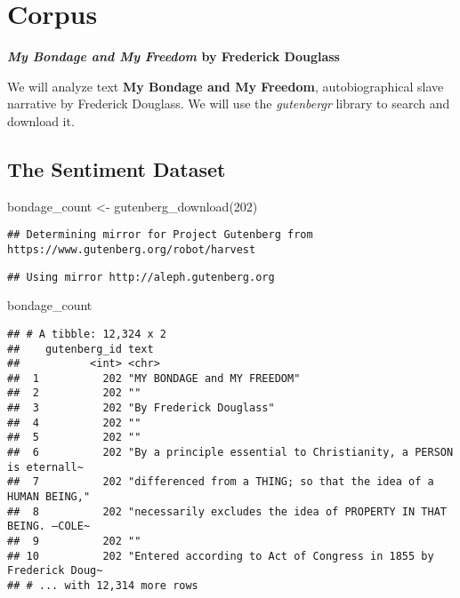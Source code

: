 \documentclass[
]{article}
\newenvironment{Shaded}{\begin{snugshade}}{\end{snugshade}}
\newcommand{\DecValTok}[1]{\textcolor[rgb]{0.00,0.00,0.81}{#1}}
\newcommand{\FunctionTok}[1]{\textcolor[rgb]{0.00,0.00,0.00}{#1}}
\newcommand{\NormalTok}[1]{#1}
\newcommand{\OtherTok}[1]{\textcolor[rgb]{0.56,0.35,0.01}{#1}}
\begin{document}
\hypertarget{corpus}{%
\section{Corpus}\label{corpus}}

\textbf{\emph{My Bondage and My Freedom} by Frederick Douglass}

We will analyze text \textbf{My Bondage and My Freedom},
autobiographical slave narrative by Frederick Douglass. We will use the
\emph{gutenbergr} library to search and download it.

\hypertarget{the-sentiment-dataset}{%
\subsection{The Sentiment Dataset}\label{the-sentiment-dataset}}

\begin{Shaded}
\begin{Highlighting}[]
\NormalTok{bondage\_count }\OtherTok{\textless{}{-}} \FunctionTok{gutenberg\_download}\NormalTok{(}\DecValTok{202}\NormalTok{)}
\end{Highlighting}
\end{Shaded}

\begin{verbatim}
## Determining mirror for Project Gutenberg from https://www.gutenberg.org/robot/harvest
\end{verbatim}

\begin{verbatim}
## Using mirror http://aleph.gutenberg.org
\end{verbatim}

\begin{Shaded}
\begin{Highlighting}[]
\NormalTok{bondage\_count}
\end{Highlighting}
\end{Shaded}

\begin{verbatim}
## # A tibble: 12,324 x 2
##    gutenberg_id text                                                            
##           <int> <chr>                                                           
##  1          202 "MY BONDAGE and MY FREEDOM"                                     
##  2          202 ""                                                              
##  3          202 "By Frederick Douglass"                                         
##  4          202 ""                                                              
##  5          202 ""                                                              
##  6          202 "By a principle essential to Christianity, a PERSON is eternall~
##  7          202 "differenced from a THING; so that the idea of a HUMAN BEING,"  
##  8          202 "necessarily excludes the idea of PROPERTY IN THAT BEING. —COLE~
##  9          202 ""                                                              
## 10          202 "Entered according to Act of Congress in 1855 by Frederick Doug~
## # ... with 12,314 more rows
\end{verbatim}
\end{document}
